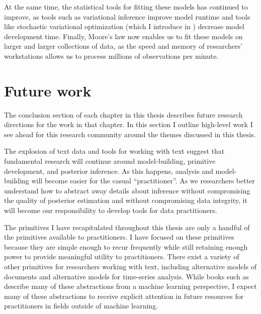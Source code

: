 At the same time, the statistical tools for fitting these models has
continued to improve, as tools such as variational inference improve
model runtime and tools like stochastic variational optimization
(which I introduce in )
decrease model development time. Finally, Moore's law now
enables us to fit these models on larger and larger collections of
data, as the speed and memory of researchers' workstations allows us
to process millions of observations per minute.

\section{Future work}
The conclusion section of each chapter in this thesis describes future
research directions for the work in that chapter.  In this section I
outline high-level work I see ahead for this research community
around the themes discussed in this thesis.

The explosion of text data and tools for working with text suggest
that fundamental research will continue around model-building,
primitive development, and posterior inference.  As this happens,
analysis and model-building will become easier for the casual
``practitioner''.  As we researchers better understand how to abstract
away details about inference without compromising the quality of
posterior estimation and without compromising data integrity, it will
become our responsibility to develop tools for data practitioners.

The primitives I have recapitulated throughout this thesis are only a
handful of the primitives available to practitioners.  I have focused
on these primitives because they are simple enough to recur frequently
while still retaining enough power to provide meaningful utility to
practitioners.  There exist a variety of other primitives for
researchers working with text, including alternative
models of documents and alternative models for time-series analysis.
While books such as \cite{bishop:2006} describe many of these
abstractions from a machine learning perspective, I expect many of these
abstractions to receive explicit attention in future resources for
practitioners in fields outside of machine learning.


